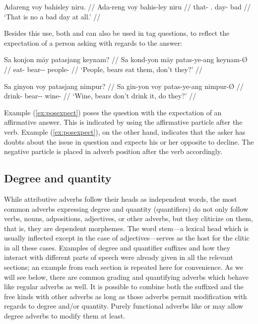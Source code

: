 \a\begingl
	\gla Adareng voy bahisley niru. //
	\glb Ada-reng voy bahis-ley niru //
	\glc that-\AargI{} \Int{}.\Neg{} day-\PargI{} bad // 
	\glft `That is no a bad day at all.' //
\endgl
\xe

Besides this use, both  and  can also be used in
tag questions, to reflect the expectation of a person asking with regards to
the answer:

\pex
\a\label{ex:posexpect}\begingl
	\gla Sa konjon māy patasjang keynam? //
	\glb Sa kond-yon māy patas-ye-ang keynam-Ø //
	\glc \PatT{} eat-\TplN{} \Aff{} bear-\Pl{}-\Aarg{} people-\Top{} //
	\glft `People, bears eat them, don't they?' //
\endgl

\a\label{ex:negexpect}\begingl
	\gla Sa ginyon voy patasjang nimpur? //
	\glb Sa gin-yon voy patas-ye-ang nimpur-Ø //
	\glc \PatT{} drink-\TplN{} \Neg{} bear-\Pl{}-\Aarg{} wine-\Top{} //
	\glft `Wine, bears don't drink it, do they?' //
\endgl
\xe

Example (\ref{ex:posexpect}) poses the question with the expectation of an 
affirmative answer. This is indicated by using the affirmative particle 
 after the verb. Example (\ref{ex:posexpect}), on the other 
hand, indicates that the asker has doubts about the issue in question and 
expects his or her opposite to decline. The negative particle  
is placed in adverb position after the verb accordingly.


\subsection{Degree and quantity}

While attributive adverbs follow their heads as independent words, the most 
common adverbs expressing degree and quantity (quantifiers) do not only follow 
verbs, nouns, adpositions, adjectives, or other adverbs, but they cliticize on 
them, that is, they are dependent morphemes. The word stem---a lexical head 
which is usually inflected except in the case of adjectives---serves as the 
host for the clitic in all these cases. Examples of degree and quantifier 
suffixes and how they interact with different parts of speech were already 
given in all the relevant sections; an example from each section is repeated 
here for convenience. As we will see below, there are common grading and 
quantifying adverbs which behave like regular adverbs as well. It is possible 
to combine both the suffixed and the free kinds with other adverbs as long as 
those adverbs permit modification with regards to degree and/or quantity. 
Purely functional adverbs like  or 
 may allow degree adverbs to modify them at 
least.

